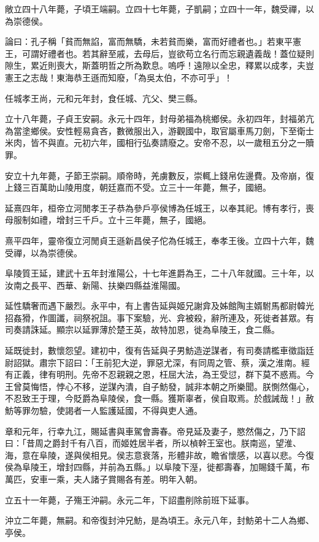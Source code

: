 \begin{pinyinscope}
敞立四十八年薨，子頃王端嗣。立四十七年薨，子凱嗣；立四十一年，魏受禪，以為崇德侯。

論曰：孔子稱「貧而無諂，富而無驕，未若貧而樂，富而好禮者也。」若東平憲王，可謂好禮者也。若其辭至戚，去母后，豈欲苟立名行而忘親遺義哉！蓋位疑則隙生，累近則喪大，斯蓋明哲之所為歎息。嗚呼！遠隙以全忠，釋累以成孝，夫豈憲王之志哉！東海恭王遜而知廢，「為吳太伯，不亦可乎」！

任城孝王尚，元和元年封，食任城、亢父、樊三縣。

立十八年薨，子貞王安嗣。永元十四年，封母弟福為桃鄉侯。永初四年，封福弟亢為當塗鄉侯。安性輕易貪吝，數微服出入，游觀國中，取官屬車馬刀劍，下至衛士米肉，皆不與直。元初六年，國相行弘奏請廢之。安帝不忍，以一歲租五分之一贖罪。

安立十九年薨，子節王崇嗣。順帝時，羌虜數反，崇輒上錢帛佐邊費。及帝崩，復上錢三百萬助山陵用度，朝廷嘉而不受。立三十一年薨，無子，國絕。

延熹四年，桓帝立河閒孝王子恭為參戶亭侯博為任城王，以奉其祀。博有孝行，喪母服制如禮，增封三千戶。立十三年薨，無子，國絕。

熹平四年，靈帝復立河閒貞王遜新昌侯子佗為任城王，奉孝王後。立四十六年，魏受禪，以為崇德侯。

阜陵質王延，建武十五年封淮陽公，十七年進爵為王，二十八年就國。三十年，以汝南之長平、西華、新陽、扶樂四縣益淮陽國。

延性驕奢而遇下嚴烈。永平中，有上書告延與姬兄謝弇及姊館陶主婿駙馬都尉韓光招姦猾，作圖讖，祠祭祝詛。事下案驗，光、弇被殺，辭所連及，死徙者甚眾。有司奏請誅延。顯宗以延罪薄於楚王英，故特加恩，徙為阜陵王，食二縣。

延既徙封，數懷怨望。建初中，復有告延與子男魴造逆謀者，有司奏請檻車徵詣廷尉詔獄。肅宗下詔曰：「王前犯大逆，罪惡尤深，有同周之管、蔡，漢之淮南。經有正義，律有明刑。先帝不忍親親之恩，枉屈大法，為王受愆，群下莫不惑焉。今王曾莫悔悟，悖心不移，逆謀內潰，自子魴發，誠非本朝之所樂聞。朕惻然傷心，不忍致王于理，今貶爵為阜陵侯，食一縣。獲斯辜者，侯自取焉。於戲誡哉！」赦魴等罪勿驗，使謁者一人監護延國，不得與吏人通。

章和元年，行幸九江，賜延書與車駕會壽春。帝見延及妻子，愍然傷之，乃下詔曰：「昔周之爵封千有八百，而姬姓居半者，所以楨幹王室也。朕南巡，望淮、海，意在阜陵，遂與侯相見。侯志意衰落，形體非故，瞻省懷感，以喜以悲。今復侯為阜陵王，增封四縣，并前為五縣。」以阜陵下溼，徙都壽春，加賜錢千萬，布萬匹，安車一乘，夫人諸子賞賜各有差。明年入朝。

立五十一年薨，子殤王沖嗣。永元二年，下詔盡削除前班下延事。

沖立二年薨，無嗣。和帝復封沖兄魴，是為頃王。永元八年，封魴弟十二人為鄉、亭侯。


\end{pinyinscope}
